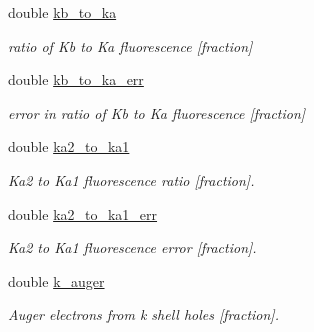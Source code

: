 \begin{DoxyCompactItemize}
\mbox{\label{structpyne_1_1atomic_a91257bf0fc9a4317667847f2fd821332}} 
double \hyperlink{structpyne_1_1atomic_a91257bf0fc9a4317667847f2fd821332}{kb\+\_\+to\+\_\+ka}
\begin{DoxyCompactList}\small\item\em ratio of Kb to Ka fluorescence \mbox{[}fraction\mbox{]} \end{DoxyCompactList}\item 
\mbox{\label{structpyne_1_1atomic_af7b6ada7ba5fb191068121f2d5a745f0}} 
double \hyperlink{structpyne_1_1atomic_af7b6ada7ba5fb191068121f2d5a745f0}{kb\+\_\+to\+\_\+ka\+\_\+err}
\begin{DoxyCompactList}\small\item\em error in ratio of Kb to Ka fluorescence \mbox{[}fraction\mbox{]} \end{DoxyCompactList}\item 
\mbox{\label{structpyne_1_1atomic_ab61491802b7e68c087170bd52ee01356}} 
double \hyperlink{structpyne_1_1atomic_ab61491802b7e68c087170bd52ee01356}{ka2\+\_\+to\+\_\+ka1}
\begin{DoxyCompactList}\small\item\em Ka2 to Ka1 fluorescence ratio \mbox{[}fraction\mbox{]}. \end{DoxyCompactList}\item 
\mbox{\label{structpyne_1_1atomic_a68bca91978ca19d4259d831dc98d8550}} 
double \hyperlink{structpyne_1_1atomic_a68bca91978ca19d4259d831dc98d8550}{ka2\+\_\+to\+\_\+ka1\+\_\+err}
\begin{DoxyCompactList}\small\item\em Ka2 to Ka1 fluorescence error \mbox{[}fraction\mbox{]}. \end{DoxyCompactList}\item 
\mbox{\label{structpyne_1_1atomic_af78e51f9c91c201143c6d63605cc534d}} 
double \hyperlink{structpyne_1_1atomic_af78e51f9c91c201143c6d63605cc534d}{k\+\_\+auger}
\begin{DoxyCompactList}\small\item\em Auger electrons from k shell holes \mbox{[}fraction\mbox{]}. \end{DoxyCompactList}\item 

\end{DoxyCompactItemize}
